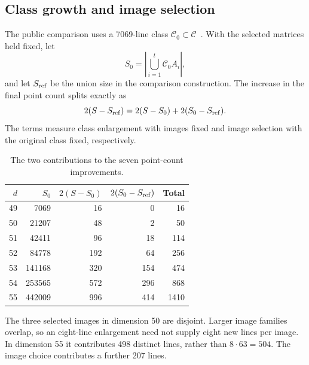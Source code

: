 \subsection{Class growth and image selection}
The public comparison uses a 7069-line class
$\mathcal C_0\subset\mathcal C$~\cite{kissingnumbers}. With the selected
matrices held fixed, let
\[
 S_0=\left|\bigcup_{i=1}^t\mathcal C_0 A_i\right|,
\]
and let $S_{\rm ref}$ be the union size in the comparison construction.
The increase in the final point count splits exactly as
\begin{equation}\label{eq:p48-gain}
 2(S-S_{\rm ref})=2(S-S_0)+2(S_0-S_{\rm ref}).
\end{equation}
The terms measure class enlargement with images fixed and image selection
with the original class fixed, respectively.

\begin{table}[ht]
\centering
\caption{The two contributions to the seven point-count improvements.}
\label{tab:p48-gain}
\begin{tabular}{rrrrr}
\toprule
$d$&$S_0$&$2(S-S_0)$&$2(S_0-S_{\rm ref})$&Total\\\midrule
49&7069&16&0&16\\
50&21207&48&2&50\\
51&42411&96&18&114\\
52&84778&192&64&256\\
53&141168&320&154&474\\
54&253565&572&296&868\\
55&442009&996&414&1410\\\bottomrule
\end{tabular}
\end{table}

The three selected images in dimension 50 are disjoint. Larger image
families overlap, so an eight-line enlargement need not supply eight
new lines per image. In dimension 55 it contributes 498 distinct lines,
rather than $8\cdot63=504$. The image choice contributes a further
207 lines.
